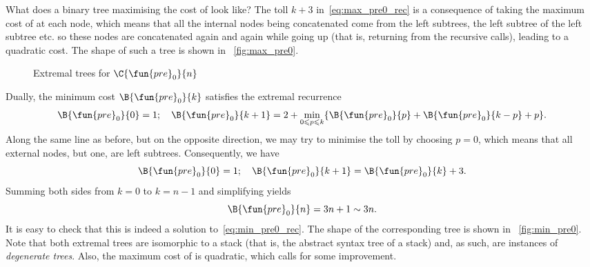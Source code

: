 What does a binary tree maximising the cost of
 look like? The toll
\(k+3\) in~\eqref{eq:max_pre0_rec} is a consequence of taking the
maximum cost of  at each node, which
means that all the internal nodes being concatenated come from the left
subtrees, the left subtree of the left subtree etc. so these nodes are
concatenated again and again while going up (that is, returning from the
recursive calls), leading to a quadratic cost. The shape of such a
tree is shown in \fig~\vref{fig:max_pre0}.
\begin{figure}[b]
\centering
{}
\qquad
{}
\caption{Extremal trees for \(\C{\fun{pre}_0}{n}\)}
\label{fig:tree_stack}
\end{figure}

Dually, the minimum cost
\(\B{\fun{pre}_0}{k}\) satisfies the
extremal recurrence
\begin{equation*}
\B{\fun{pre}_0}{0} = 1;\quad
\B{\fun{pre}_0}{k+1} =
  2 + \min_{0 \leqslant p \leqslant k}\{\B{\fun{pre}_0}{p}
                                  + \B{\fun{pre}_0}{k-p} + p\}.
\end{equation*}
Along the same line as before, but on the opposite direction, we may
try to minimise the toll by choosing \(p=0\), which means that all
external nodes, but one, are left subtrees. Consequently, we have
\begin{equation}
\B{\fun{pre}_0}{0} = 1;\quad
\B{\fun{pre}_0}{k+1} = \B{\fun{pre}_0}{k} + 3.
\label{eq:min_pre0_rec}
\end{equation}
Summing both sides from \(k=0\) to \(k=n-1\) and simplifying yields
\begin{equation*}
\B{\fun{pre}_0}{n} = 3n + 1 \sim 3n.
\end{equation*}
It is easy to check that this is indeed a solution
to~\eqref{eq:min_pre0_rec}. The shape of the corresponding tree is
shown in \fig~\vref{fig:min_pre0}. Note that both extremal trees are
isomorphic to a stack (that is, the abstract syntax
tree of a stack) and, as such, are
instances of \emph{degenerate trees}. Also, the maximum cost of
 is quadratic, which
calls for some improvement.

